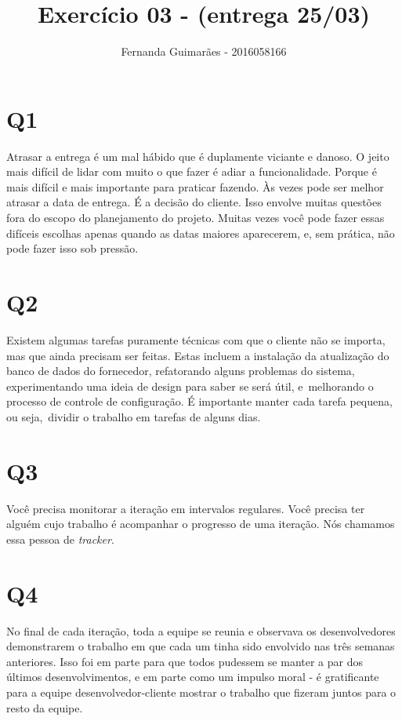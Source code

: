 \documentclass[11pt]{article}
\author{Fernanda Guimarães - 2016058166}
\date{}
\title{Exercício 03 - (entrega 25/03)}
\begin{document}
\maketitle

\section{Q1}
\label{sec:orgd9b4918}
Atrasar a entrega é um mal hábido que é duplamente viciante e danoso. O jeito mais
difícil de lidar com muito o que fazer é adiar a funcionalidade. Porque é mais difícil e
mais importante para praticar fazendo. Às vezes pode ser melhor atrasar a data de
entrega. É a decisão do cliente. Isso envolve muitas questões fora do escopo do
planejamento do projeto. Muitas vezes você pode fazer essas difíceis escolhas apenas
quando as datas maiores aparecerem, e, sem prática, não pode fazer isso sob
pressão.

\section{Q2}
\label{sec:orgda5c00f}
Existem algumas tarefas puramente técnicas com que o cliente não se importa, mas que
ainda precisam ser feitas. Estas incluem a instalação da atualização do banco de dados
do fornecedor, refatorando alguns problemas do sistema, experimentando uma ideia de
design para saber se será útil, e melhorando o processo de controle de configuração. É
importante manter cada tarefa pequena, ou seja, dividir o trabalho em tarefas de alguns
dias.

\section{Q3}
\label{sec:orgcd254ff}
Você precisa monitorar a iteração em intervalos regulares. Você precisa ter alguém cujo
trabalho é acompanhar o progresso de uma iteração. Nós chamamos essa pessoa de
\emph{tracker}.

\section{Q4}
\label{sec:org99d682e}
No final de cada iteração, toda a equipe se reunia e observava os desenvolvedores
demonstrarem o trabalho em que cada um tinha sido envolvido nas três semanas anteriores.
Isso foi em parte para que todos pudessem se manter a par dos últimos desenvolvimentos,
e em parte como um impulso moral - é gratificante para a equipe desenvolvedor-cliente
mostrar o trabalho que fizeram juntos para o resto da equipe.
\end{document}
